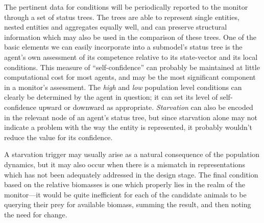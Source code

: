 The pertinent data for conditions will be periodically reported to the
monitor through a set of status trees. The trees are able to represent
single entities, nested entities and aggregates equally well, and can
preserve structural information which may also be used in the
comparison of these trees.  One of the basic elements we can easily
incorporate into a sub\-model's status tree is the agent's own
assessment of its competence relative to its state-vector and its
local conditions. This measure of ``self-confidence'' can probably be
maintained at little computational cost for most agents, and may be
the most significant component in a monitor's assessment. The
\emph{high} and \emph{low} population level conditions can clearly be
determined by the agent in question; it can set its level of
self-confidence upward or downward as appropriate. \emph{Starvation}
can also be encoded in the relevant node of an agent's status tree,
but since starvation alone may not indicate a problem with the way the
entity is represented, it probably wouldn't reduce the value for its
confidence.

A starvation trigger may usually arise as a natural consequence of the
population dynamics, but it may also occur when there is a mismatch in
rep\-re\-sen\-ta\-tions which has not been adequately addressed in the design
stage.  The final condition based on the relative biomasses is one
which properly lies in the realm of the monitor---it would be quite
inefficient for each of the candidate animals to be querying their
prey for available biomass, summing the result, and then noting the
need for change.


